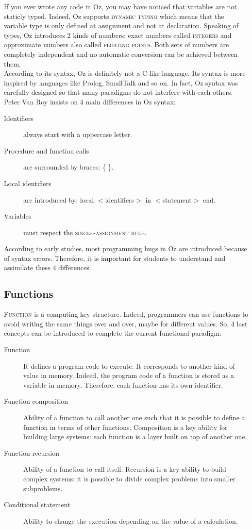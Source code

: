 \documentclass[11pt,a4paper,twoside,openright]{report}
\begin{document}
If you ever wrote any code in Oz, you may have noticed that variables are not 
staticly typed. Indeed, Oz supports \textsc{dynamic typing} which means that 
the variable type is only defined at assignment and not at declaration. 
Speaking 
of types, Oz introduces 2 kinds of numbers: exact numbers called 
\textsc{integers} and approximate numbers also called \textsc{floating points}. 
Both sets of numbers are completely independent and no automatic conversion can 
be achieved between them.\\

According to its syntax, Oz is definitely not a C-like language. Its syntax is 
more inspired by languages like Prolog, SmallTalk and so on. In fact, Oz syntax 
was carefully designed so that many paradigms do not interfere with each others. 
Peter Van Roy insists on 4 main differences in Oz syntax:

\begin{description}
	\item[Identifiers] always start with a uppercase letter.
	\item[Procedure and function calls] are surrounded by braces: 
\textsc{\{  \}}.
	\item[Local identifiers] are introduced by: local $<$identifiers$>$ in 
$<$statement$>$ end.
	\item[Variables] must respect the \textsc{single-assignment rule}.
\end{description}

According to early studies, most programming bugs in Oz are introduced because 
of syntax errors. Therefore, it is important for students to understand and 
assimilate these 4 differences.

\subsection{Functions}

\textsc{Function} is a computing key structure. Indeed, programmers can use 
functions to avoid writing the same things over and over, maybe for different 
values. So, 4 last concepts can be introduced to complete the current 
functional paradigm:

\begin{description}
 \item[Function] It defines a program code to execute. It corresponds to 
another kind of value in memory. Indeed, the program code of a function is 
stored as a variable in memory. Therefore, each function has its own identifier.
 \item[Function composition] Ability of a function to call another one such 
that it is possible to define a function in terms of other functions. 
Composition is a key ability for building large systems: each function is a 
layer built on top of another one.
 \item[Function recursion] Ability of a function to call itself. Recursion is a 
key ability to build complex systems: it is possible to divide complex 
problems into smaller subproblems.
 \item[Conditional statement] Ability to change the execution depending on the 
value of a calculation.
\end{description}
\end{document}
